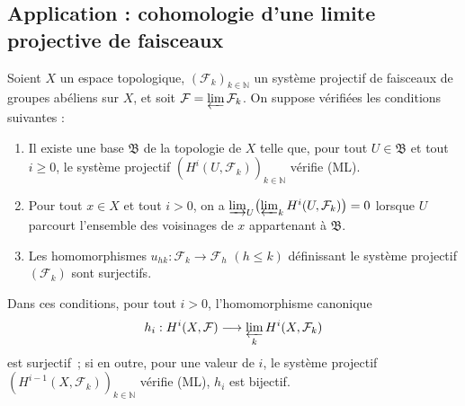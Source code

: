 \subsection{Application : cohomologie d'une limite projective de faisceaux}
\label{subsection:0.13.3-fr}

\begin{proposition}[13.3.1]
\label{0.13.3.1-fr}
Soient $X$ un espace topologique,
$(\mathcal F_k)_{k\in\mathbb N}$ un système projectif de faisceaux de
groupes abéliens sur $X$, et soit
$\mathcal F=\varprojlim\mathcal F_k$. On suppose vérifiées les conditions
suivantes :
\begin{enumerate}
\item[\emph{(i)}]
Il existe une base $\mathfrak B$ de la topologie de $X$ telle que,
pour tout $U\in\mathfrak B$ et tout $i\geq0$, le système projectif
$(H^i(U,\mathcal F_k))_{k\in\mathbb N}$ vérifie \textup{(ML)}.
\item[\emph{(ii)}]
Pour tout $x\in X$ et tout $i>0$, on a
$\varinjlim_U\bigl(\varprojlim_k H^i(U,\mathcal F_k)\bigr)=0$
lorsque $U$ parcourt l'ensemble des voisinages de $x$ appartenant à
$\mathfrak B$.
\item[\emph{(iii)}]
Les homomorphismes
$u_{hk}:\mathcal F_k\to\mathcal F_h$ $(h\leq k)$ définissant le système
projectif $(\mathcal F_k)$ sont surjectifs.
\end{enumerate}

Dans ces conditions, pour tout $i>0$, l'homomorphisme canonique
\[
h_i:H^i(X,\mathcal F)\longrightarrow
\varprojlim_k H^i(X,\mathcal F_k)
\]
est surjectif~; si en outre, pour une valeur de $i$, le système
projectif $(H^{i-1}(X,\mathcal F_k))_{k\in\mathbb N}$ vérifie \textup{(ML)}, $h_i$
est bijectif.
\end{proposition}

